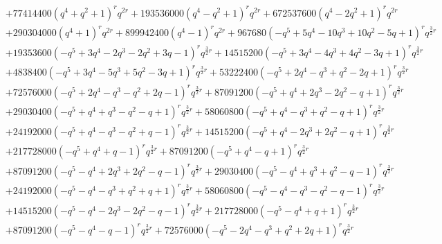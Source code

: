 \documentclass[11pt,english]{amsart}
\numberwithin{equation}{section}
\numberwithin{figure}{section}
\theoremstyle{plain}
\theoremstyle{plain}
\theoremstyle{definition}
\theoremstyle{remark}
\begin{document}
{\begin{align*}
& + 77414400  {\left(q^{4} + q^{2} + 1\right)}^{r} q^{2  r} + 193536000  {\left(q^{4} - q^{2} + 1\right)}^{r} q^{2  r} + 672537600  {\left(q^{4} - 2  q^{2} + 1\right)}^{r} q^{2  r} \\
& + 290304000  {\left(q^{4} + 1\right)}^{r} q^{2  r} + 899942400  {\left(q^{4} - 1\right)}^{r} q^{2  r} + 967680  {\left(-q^{5} + 5  q^{4} - 10  q^{3} + 10  q^{2} - 5  q + 1\right)}^{r} q^{\frac{3}{2}  r} \\
& + 19353600  {\left(-q^{5} + 3  q^{4} - 2  q^{3} - 2  q^{2} + 3  q - 1\right)}^{r} q^{\frac{3}{2}  r} + 14515200  {\left(-q^{5} + 3  q^{4} - 4  q^{3} + 4  q^{2} - 3  q + 1\right)}^{r} q^{\frac{3}{2}  r} \\
& + 4838400  {\left(-q^{5} + 3  q^{4} - 5  q^{3} + 5  q^{2} - 3  q + 1\right)}^{r} q^{\frac{3}{2}  r} + 53222400  {\left(-q^{5} + 2  q^{4} - q^{3} + q^{2} - 2  q + 1\right)}^{r} q^{\frac{3}{2}  r} \\
& + 72576000  {\left(-q^{5} + 2  q^{4} - q^{3} - q^{2} + 2  q - 1\right)}^{r} q^{\frac{3}{2}  r} + 87091200  {\left(-q^{5} + q^{4} + 2  q^{3} - 2  q^{2} - q + 1\right)}^{r} q^{\frac{3}{2}  r} \\
& + 29030400  {\left(-q^{5} + q^{4} + q^{3} - q^{2} - q + 1\right)}^{r} q^{\frac{3}{2}  r} + 58060800  {\left(-q^{5} + q^{4} - q^{3} + q^{2} - q + 1\right)}^{r} q^{\frac{3}{2}  r} \\
& + 24192000  {\left(-q^{5} + q^{4} - q^{3} - q^{2} + q - 1\right)}^{r} q^{\frac{3}{2}  r} + 14515200  {\left(-q^{5} + q^{4} - 2  q^{3} + 2  q^{2} - q + 1\right)}^{r} q^{\frac{3}{2}  r} \\
& + 217728000  {\left(-q^{5} + q^{4} + q - 1\right)}^{r} q^{\frac{3}{2}  r} + 87091200  {\left(-q^{5} + q^{4} - q + 1\right)}^{r} q^{\frac{3}{2}  r} \\
& + 87091200  {\left(-q^{5} - q^{4} + 2  q^{3} + 2  q^{2} - q - 1\right)}^{r} q^{\frac{3}{2}  r} + 29030400  {\left(-q^{5} - q^{4} + q^{3} + q^{2} - q - 1\right)}^{r} q^{\frac{3}{2}  r} \\
& + 24192000  {\left(-q^{5} - q^{4} - q^{3} + q^{2} + q + 1\right)}^{r} q^{\frac{3}{2}  r} + 58060800  {\left(-q^{5} - q^{4} - q^{3} - q^{2} - q - 1\right)}^{r} q^{\frac{3}{2}  r} \\
& + 14515200  {\left(-q^{5} - q^{4} - 2  q^{3} - 2  q^{2} - q - 1\right)}^{r} q^{\frac{3}{2}  r} + 217728000  {\left(-q^{5} - q^{4} + q + 1\right)}^{r} q^{\frac{3}{2}  r} \\
& + 87091200  {\left(-q^{5} - q^{4} - q - 1\right)}^{r} q^{\frac{3}{2}  r} + 72576000  {\left(-q^{5} - 2  q^{4} - q^{3} + q^{2} + 2  q + 1\right)}^{r} q^{\frac{3}{2}  r} \\

\end{align*}}
\end{document}
